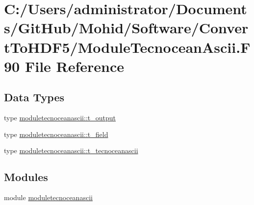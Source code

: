 \hypertarget{_module_tecnocean_ascii_8_f90}{}\section{C\+:/\+Users/administrator/\+Documents/\+Git\+Hub/\+Mohid/\+Software/\+Convert\+To\+H\+D\+F5/\+Module\+Tecnocean\+Ascii.F90 File Reference}
\label{_module_tecnocean_ascii_8_f90}
\subsection*{Data Types}
\begin{DoxyCompactItemize}
\item 
type \mbox{\hyperlink{structmoduletecnoceanascii_1_1t__output}{moduletecnoceanascii\+::t\+\_\+output}}
\item 
type \mbox{\hyperlink{structmoduletecnoceanascii_1_1t__field}{moduletecnoceanascii\+::t\+\_\+field}}
\item 
type \mbox{\hyperlink{structmoduletecnoceanascii_1_1t__tecnoceanascii}{moduletecnoceanascii\+::t\+\_\+tecnoceanascii}}
\end{DoxyCompactItemize}
\subsection*{Modules}
\begin{DoxyCompactItemize}
\item 
module \mbox{\hyperlink{namespacemoduletecnoceanascii}{moduletecnoceanascii}}
\end{DoxyCompactItemize}
